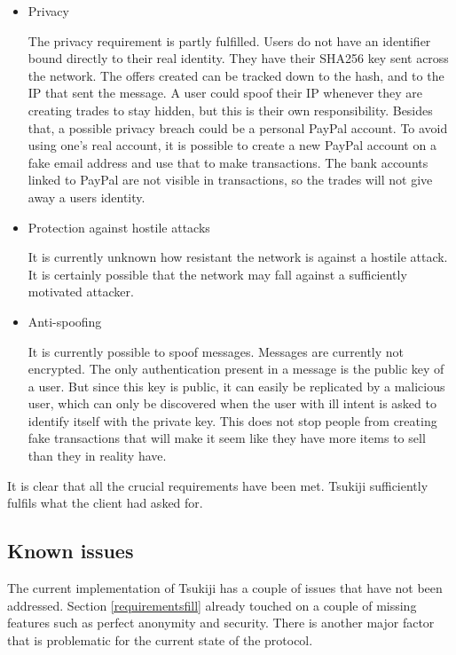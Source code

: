 \begin{itemize}
\item Privacy

The privacy requirement is partly fulfilled.
Users do not have an identifier bound directly to their real identity.
They have their SHA256 key sent across the network.
The offers created can be tracked down to the hash, and to the IP that sent the message.
A user could spoof their IP whenever they are creating trades to stay hidden, but this is their own responsibility.
Besides that, a possible privacy breach could be a personal PayPal account.
To avoid using one's real account, it is possible to create a new PayPal account on a fake email address and use that to make transactions.
The bank accounts linked to PayPal are not visible in transactions, so the trades will not give away a users identity.

\item Protection against hostile attacks

It is currently unknown how resistant the network is against a hostile attack.
It is certainly possible that the network may fall against a sufficiently motivated attacker.

\item Anti-spoofing

It is currently possible to spoof messages.
Messages are currently not encrypted.
The only authentication present in a message is the public key of a user. 
But since this key is public, it can easily be replicated by a malicious user, which can only be discovered when the user with ill intent is asked to identify itself with the private key.
This does not stop people from creating fake transactions that will make it seem like they have more items to sell than they in reality have.
\end{itemize}

It is clear that all the crucial requirements have been met.
Tsukiji sufficiently fulfils what the client had asked for.

\subsection{Known issues}
\label{knownissues}
The current implementation of Tsukiji has a couple of issues that have not been addressed.
Section \ref{requirementsfill} already touched on a couple of missing features such as perfect anonymity and security.
There is another major factor that is problematic for the current state of the protocol.

